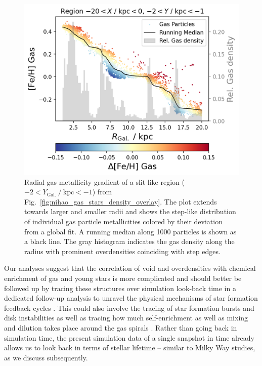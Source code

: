 \documentclass[twocolumn,apj,numberedappendix,appendixfloats]{openjournal}
\begin{document}
\begin{CJK*}{UTF8}{gbsn}
\begin{figure}
    \centering
    \includegraphics[width=\columnwidth]{figures/region_r_feh_gas_density.png}
    \caption{Radial gas metallicity gradient of a slit-like region ($-2 < Y_\mathrm{Gal.}~/~\mathrm{kpc} < -1$) from Fig.~\ref{fig:nihao_gas_stars_density_overlay}. The plot extends towards larger and smaller radii and shows the step-like distribution of individual gas particle metallicities colored by their deviation from a global fit. A running median along 1000 particles is shown as a black line. The gray histogram indicates the gas density along the radius with prominent overdensities coinciding with step edges.}
    \label{fig:region_r_feh_gas_density}
\end{figure}

Our analyses suggest that the correlation of void and overdensities with chemical enrichment of gas and young stars is more complicated and should better be followed up by tracing these structures over simulation look-back time in a dedicated follow-up analysis to unravel the physical mechanisms of star formation feedback cycles . This could also involve the tracing of star formation bursts and disk instabilities \citep{Sanchez2014, SanchezBlazquez2014, Ho2015} as well as tracing how much self-enrichment as well as mixing and dilution takes place around the gas spirals \citep{Ho2017c}. Rather than going back in simulation time, the present simulation data of a single snapshot in time already allows us to look back in terms of stellar lifetime -- similar to Milky Way studies, as we discuss subsequently.


\end{CJK*}
\end{document}
